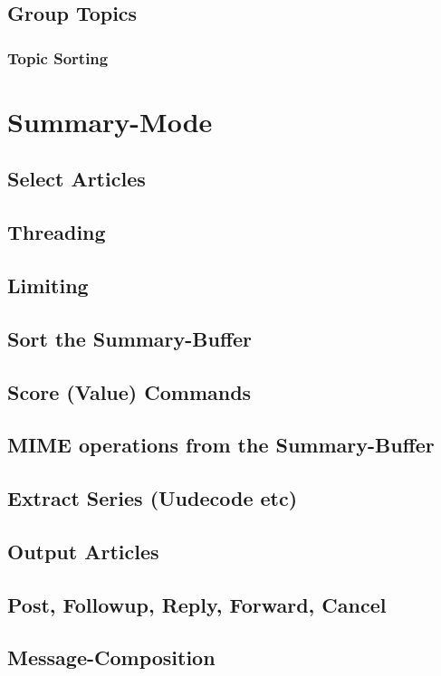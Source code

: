 \documentclass{article}
\begin{document}
	\subsection*{Group Topics}
	\GroupTopicsGeneral
	\subsubsection*{Topic Sorting}
	\TopicSorting
\section*{Summary-Mode}
\SummaryModeGeneral
	\subsection*{Select Articles}
	\SelectArticles
%
	\subsection*{Threading}
	\Threading
%
	\subsection*{Limiting}
	\Limiting
	\subsection*{Sort the Summary-Buffer}
	\SortSummary
	\subsection*{Score (Value) Commands}
	\Scoring
% 
	\subsection*{MIME operations from the Summary-Buffer}
	\MIMESummary
	\subsection*{Extract Series (Uudecode etc)}
	\ExtractSeries
	\subsection*{Output Articles}
	\OutputArticles
%
	\subsection*{Post, Followup, Reply, Forward, Cancel}
	\PostReplyetc
	\subsection*{Message-Composition}
	\MsgCompositionGeneral
\end{document}
